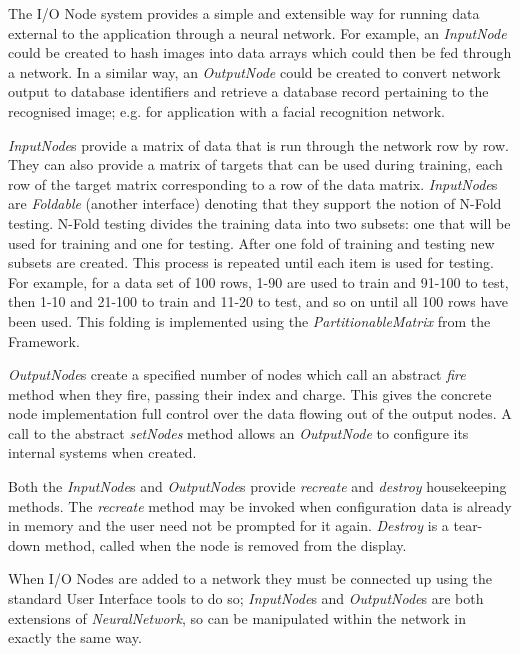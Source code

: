 \documentclass{acm_proc_article-sp}
\begin{document}
{
The I/O Node system provides a simple and extensible way for running data external to the application through a neural network. For example, an {\textit{InputNode}} could be created to hash images into data arrays which could then be fed through a network. In a similar way, an {\textit{OutputNode}} could be created to convert network output to database identifiers and retrieve a database record pertaining to the recognised image; e.g. for application with a facial recognition network.

{\textit{InputNode}}s provide a matrix of data that is run through the network row by row. They can also provide a matrix of targets that can be used during training, each row of the target matrix corresponding to a row of the data matrix. {\textit{InputNode}}s are {\textit{Foldable}} (another interface) denoting that they support the notion of N-Fold testing. N-Fold testing divides the training data into two subsets: one that will be used for training and one for testing. After one fold of training and testing new subsets are created. This process is repeated until each item is used for testing. For example, for a data set of 100 rows, 1-90 are used to train and 91-100 to test, then 1-10 and 21-100 to train and 11-20 to test, and so on until all 100 rows have been used. This folding is implemented using the {\textit{PartitionableMatrix}} from the Framework.

{\textit{OutputNode}}s create a specified number of nodes which call an abstract {\textit{fire}} method when they fire, passing their index and charge. This gives the concrete node implementation full control over the data flowing out of the output nodes. A call to the abstract {\textit{setNodes}} method allows an {\textit{OutputNode}} to configure its internal systems when created.

Both the {\textit{InputNode}}s and {\textit{OutputNode}}s provide {\textit{recreate}} and {\textit{destroy}} housekeeping methods. The {\textit{recreate}} method may be invoked when configuration data is already in memory and the user need not be prompted for it again. {\textit{Destroy}} is a tear-down method, called when the node is removed from the display. 

When I/O Nodes are added to a network they must be connected up using the standard User Interface tools to do so; {\textit{InputNode}}s and {\textit{OutputNode}}s are both extensions of {\textit{NeuralNetwork}}, so can be manipulated within the network in exactly the same way.
}
\end{document}

